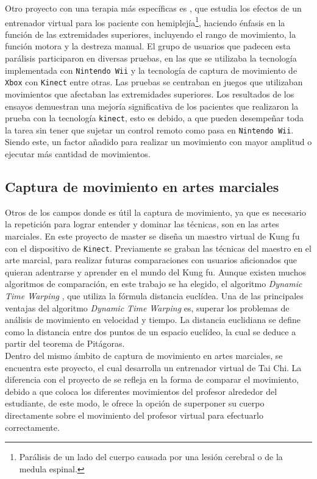 Otro proyecto con una terapia más específicas es \cite{sin2013additional}, que estudia los efectos de un entrenador virtual para los paciente con hemiplejía\footnote{Parálisis de un lado del cuerpo causada por una lesión cerebral o de la medula espinal.}, haciendo énfasis en la función de las extremidades superiores, incluyendo el rango de movimiento, la función motora y la destreza manual. El grupo de usuarios que padecen esta parálisis participaron en diversas pruebas, en las que se utilizaba la tecnología implementada con \texttt{Nintendo Wii} y la tecnología de captura de movimiento de \texttt{Xbox} con \texttt{Kinect} entre otras. Las pruebas se centraban en juegos que utilizaban movimientos que afectaban las extremidades superiores. Los resultados de los ensayos demuestran una mejoría significativa de los pacientes que realizaron la prueba con la tecnología \texttt{kinect}, esto es debido, a que pueden desempeñar toda la tarea sin tener que sujetar un control remoto como pasa en \texttt{Nintendo Wii}. Siendo este, un factor añadido para realizar un movimiento con mayor amplitud o ejecutar más cantidad de movimientos.

\subsection{Captura de movimiento en artes marciales}

Otros de los campos donde es útil la captura de movimiento, ya que es necesario la repetición para lograr entender y dominar las técnicas, son en las artes marciales. En este proyecto de master \cite{Keerthy:Thesis:2012}  se diseña un maestro virtual de Kung fu con el dispositivo de \texttt{Kinect}. Previamente se graban las técnicas del maestro en el arte marcial, para realizar futuras comparaciones con usuarios aficionados que quieran adentrarse y aprender en el mundo del Kung fu. Aunque existen muchos algoritmos de comparación, en este trabajo se ha elegido, el algoritmo \textit{Dynamic Time Warping} , que utiliza la fórmula  distancia euclídea. Una de las principales ventajas del algoritmo \textit{Dynamic Time Warping} es, superar los problemas de análisis de movimiento en velocidad y tiempo. La distancia euclidiana se define como la distancia entre dos puntos de un espacio euclídeo, la cual se deduce a partir del teorema de Pitágoras.\\

Dentro del mismo ámbito de captura de movimiento en artes marciales, se encuentra este proyecto\cite{chua2003training}, el cual desarrolla un entrenador virtual de Tai Chi. La diferencia con el proyecto de  \cite{Keerthy:Thesis:2012} se refleja en la forma de  comparar el movimiento, debido a que coloca los diferentes movimientos del profesor alrededor del estudiante, de este modo, le ofrece la opción de superponer su cuerpo directamente sobre el movimiento del profesor virtual para efectuarlo correctamente. 

